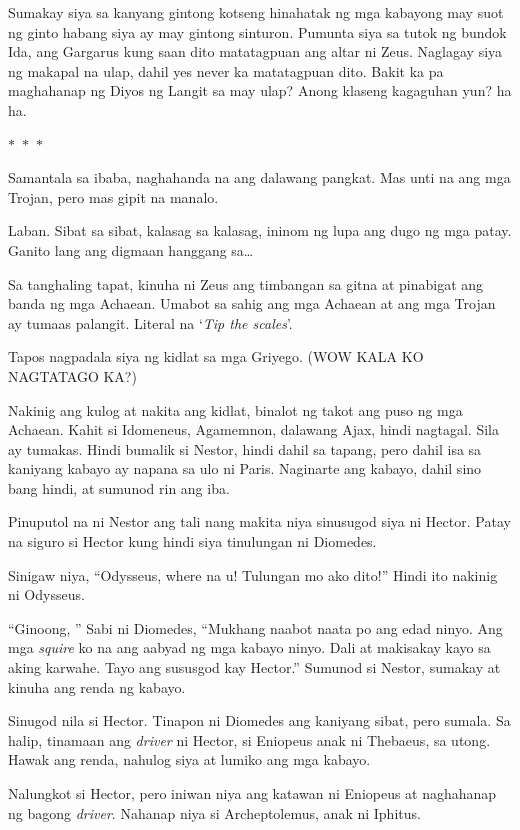 \documentclass[12pt,letterpaper]{report}
\newcommand{\seperate}{\begin{center}$\ast$~$\ast$~$\ast$\end{center}}
\begin{document}
Sumakay siya sa kanyang gintong kotseng hinahatak ng mga kabayong may suot ng ginto habang siya ay may gintong sinturon. Pumunta siya sa tutok ng bundok Ida, ang Gargarus kung saan dito matatagpuan ang altar ni Zeus. Naglagay siya ng makapal na ulap, dahil yes never ka matatagpuan dito. Bakit ka pa maghahanap ng Diyos ng Langit sa may ulap? Anong klaseng kagaguhan yun? ha ha.

\seperate

Samantala sa ibaba, naghahanda na ang dalawang pangkat. Mas unti na ang mga Trojan, pero mas gipit na manalo.

Laban. Sibat sa sibat, kalasag sa kalasag, ininom ng lupa ang dugo ng mga patay. Ganito lang ang digmaan hanggang sa\dots

Sa tanghaling tapat, kinuha ni Zeus ang timbangan sa gitna at pinabigat ang banda ng mga Achaean. Umabot sa sahig ang mga Achaean at ang mga Trojan ay tumaas palangit. Literal na `\textit{Tip the scales}'.

Tapos nagpadala siya ng kidlat sa mga Griyego. (WOW KALA KO NAGTATAGO KA?)

Nakinig ang kulog at nakita ang kidlat, binalot ng takot ang puso ng mga Achaean. Kahit si Idomeneus, Agamemnon, dalawang Ajax, hindi nagtagal. Sila ay tumakas. Hindi bumalik si Nestor, hindi dahil sa tapang, pero dahil isa sa kaniyang kabayo ay napana sa ulo ni Paris. Naginarte ang kabayo, dahil sino bang hindi, at sumunod rin ang iba.

Pinuputol na ni Nestor ang tali nang makita niya sinusugod siya ni Hector. Patay na siguro si Hector kung hindi siya tinulungan ni Diomedes.

Sinigaw niya, ``Odysseus, where na u! Tulungan mo ako dito!'' Hindi ito nakinig ni Odysseus. 

``Ginoong, '' Sabi ni Diomedes, ``Mukhang naabot naata po ang edad ninyo. Ang mga \textit{squire} ko na ang aabyad ng mga kabayo ninyo. Dali at makisakay kayo sa aking karwahe. Tayo ang sususgod kay Hector.'' Sumunod si Nestor, sumakay at kinuha ang renda ng kabayo.

Sinugod nila si Hector. Tinapon ni Diomedes ang kaniyang sibat, pero sumala. Sa halip, tinamaan ang \textit{driver} ni Hector, si Eniopeus anak ni Thebaeus, sa utong. Hawak ang renda, nahulog siya at lumiko ang mga kabayo. 

Nalungkot si Hector, pero iniwan niya ang katawan ni Eniopeus at naghahanap ng bagong \textit{driver}. Nahanap niya si Archeptolemus, anak ni Iphitus.
\end{document}
